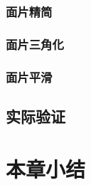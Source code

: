 \subsubsection{面片精简}

\subsubsection{面片三角化}

\subsubsection{面片平滑}

\subsection{实际验证}


\section{本章小结} 